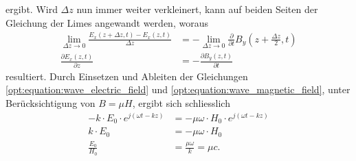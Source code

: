 ergibt.
Wird $\Delta z$ nun immer weiter verkleinert, kann auf beiden Seiten der Gleichung der Limes angewandt werden, woraus
\begin{align*}
\lim_{\Delta z \to 0} \frac{E_x(z+\Delta z,t) - E_x(z,t)}{\Delta z}
&=
-\lim_{\Delta z \to 0} \frac{\partial}{\partial t} B_y\left(z+\frac{\Delta z}{2},t\right)
\\
\frac{\partial E_x(z,t)}{\partial z}
&=
-\frac{\partial B_y(z,t)}{\partial t}
\end{align*}
resultiert.
Durch Einsetzen und Ableiten der Gleichungen \eqref{opt:equation:wave_electric_field} und \eqref{opt:equation:wave_magnetic_field}, unter Berücksichtigung von $B = \mu H$, ergibt sich schliesslich
\begin{align*}
-k \cdot E_0 \cdot e^{j(\omega t-k z)}
&=
-\mu \omega \cdot H_0 \cdot e^{j(\omega t-k z)}
\\
k \cdot E_0
&=
-\mu \omega \cdot H_0
\\
\frac{E_0}{H_0}
&=
\frac{\mu \omega}{k}
=
\mu c
.
\end{align*}

